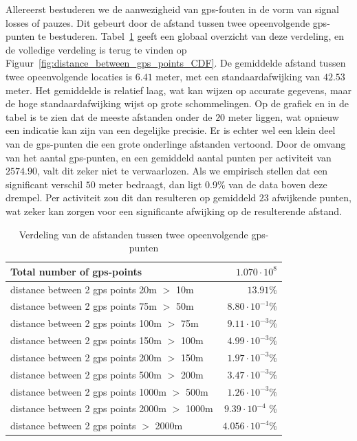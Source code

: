 Allereerst bestuderen we de aanwezigheid van \ac{gps}-fouten in de vorm van
signal losses of pauzes. Dit gebeurt door de afstand tussen twee opeenvolgende
\ac{gps}-punten te bestuderen.
Tabel~\ref{tab:distance_between_gps_points_table} geeft een globaal overzicht
van deze verdeling, en de volledige verdeling is terug te vinden op
Figuur~\ref{fig:distance_between_gps_points_CDF}. De gemiddelde afstand tussen
twee opeenvolgende locaties is $6.41$ meter, met een standaardafwijking van
$42.53$ meter. Het gemiddelde is relatief laag, wat kan wijzen op accurate
gegevens, maar de hoge standaardafwijking wijst op grote schommelingen. Op de
grafiek en in de tabel is te zien dat de meeste afstanden onder de $20$ meter
liggen, wat opnieuw een indicatie kan zijn van een degelijke precisie. Er is
echter wel een klein deel van de \ac{gps}-punten die een grote onderlinge
afstanden vertoond. Door de omvang van het aantal \ac{gps}-punten, en een
gemiddeld aantal punten per activiteit van $2574.90$, valt dit zeker niet te
verwaarlozen. Als we empirisch stellen dat een significant verschil $50$ meter
bedraagt, dan ligt 0.9\% van de data boven deze drempel. Per activiteit zou dit
dan resulteren op gemiddeld $23$ afwijkende punten, wat zeker kan zorgen voor
een significante afwijking op de resulterende afstand.
\begin{table}[h]
    \centering
    \begin{tabular}{lr}
        \toprule
        \midrule
        Total number of gps-points                    & $1.070 \cdot 10^8$       \\
        \hline
        distance between 2 gps points 20m $>$ 10m     & $13.91\%$                \\
        distance between 2 gps points 75m $>$ 50m     & $8.80 \cdot 10^{-1}\%$   \\
        distance between 2 gps points 100m $>$ 75m    & $9.11 \cdot 10^{-3}\%$   \\
        distance between 2 gps points 150m $>$ 100m   & $4.99 \cdot 10^{-3}\%$   \\
        distance between 2 gps points 200m $>$ 150m   & $1.97 \cdot 10^{-3}\%$   \\
        distance between 2 gps points 500m $>$ 200m   & $3.47 \cdot  10^{-3} \%$ \\
        distance between 2 gps points 1000m $>$ 500m  & $1.26 \cdot 10^{-3} \%$  \\
        distance between 2 gps points 2000m $>$ 1000m & $9.39 \cdot 10^{-4}$ \%  \\
        distance between 2 gps points $>$ 2000m       & $4.056 \cdot 10^{-4} \%$ \\
        \midrule
        \bottomrule
    \end{tabular}
    \captionsetup{justification=centering}
    \caption{Verdeling van de afstanden tussen twee opeenvolgende gps-punten}\label{tab:distance_between_gps_points_table}
\end{table}
